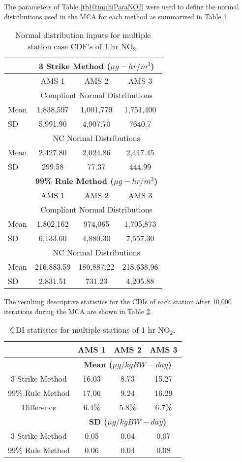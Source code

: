 The parameters of Table \ref{tb10:multiParaNO2} were used to define the normal distributions used in the MCA for each method as summarized in Table \ref{tb11:multiNO2}.
% 
\begin{table}[!htb]
\centering
\caption{Normal distribution inputs for multiple station case CDF’s of 1 hr NO$_{2}$.}
\label{tb11:multiNO2}
\begin{tabular}{@{}lccc@{}}
\toprule
 & \multicolumn{3}{c}{\textbf{3 Strike Method ($\mu g-hr/m^{3}$)}} \\ \midrule
 & AMS 1 & AMS 2 & AMS 3 \\
 & \multicolumn{3}{c}{Compliant Normal Distributions} \\
Mean & 1,838,597 & 1,001,779 & 1,751,400 \\
SD & 5,991.90 & 4,907.70 & 7640.7 \\
 & \multicolumn{3}{c}{NC Normal Distributions} \\
Mean & 2,427.80 & 2,024.86 & 2,447.45 \\
SD & 299.58 & 77.37 & 444.99 \\
 & \multicolumn{3}{c}{\textbf{99\% Rule Method ($\mu g-hr/m^{3}$)}} \\
 & AMS 1 & AMS 2 & AMS 3 \\
 & \multicolumn{3}{c}{Compliant Normal Distributions} \\
Mean & 1,802,162 & 974,065 & 1,705,873 \\
SD & 6,133.60 & 4,880.30 & 7,557.30 \\
 & \multicolumn{3}{c}{NC Normal Distributions} \\
Mean & 216,883.59 & 180,887.22 & 218,638.96 \\
SD & 2,831.51 & 731.23 & 4,205.88 \\ \bottomrule
\end{tabular}
\end{table}

The resulting descriptive statistics for the CDIs of each station after 10,000 iterations during the MCA are shown in Table \ref{tb12:CDIstatsNO2}. 
%
\begin{table}[!htb]
\centering
\caption{CDI statistics for multiple stations of 1 hr NO$_{2}$.}
\label{tb12:CDIstatsNO2}
\begin{tabular}{@{}cccc@{}}
\toprule
 & \textbf{AMS 1} & \textbf{AMS 2} & \textbf{AMS 3} \\ \midrule
 & \multicolumn{3}{c}{\textbf{Mean ($\mu g/kgBW-day$)}} \\
3 Strike Method & 16.03 & 8.73 & 15.27 \\
99\% Rule Method & 17.06 & 9.24 & 16.29 \\
Difference & 6.4\% & 5.8\% & 6.7\% \\
 & \multicolumn{3}{c}{\textbf{SD ($\mu g/kgBW-day$)}} \\
3 Strike Method & 0.05 & 0.04 & 0.07 \\
99\% Rule Method & 0.06 & 0.04 & 0.08 \\ \bottomrule
\end{tabular}
\end{table}

